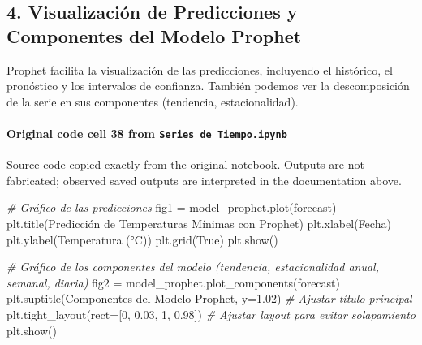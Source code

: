 \documentclass[
  11pt,
]{article}
\newenvironment{Shaded}{}{}
\newcommand{\CommentTok}[1]{\textcolor[rgb]{0.38,0.63,0.69}{\textit{#1}}}
\newcommand{\DecValTok}[1]{\textcolor[rgb]{0.25,0.63,0.44}{#1}}
\newcommand{\FloatTok}[1]{\textcolor[rgb]{0.25,0.63,0.44}{#1}}
\newcommand{\NormalTok}[1]{#1}
\newcommand{\OperatorTok}[1]{\textcolor[rgb]{0.40,0.40,0.40}{#1}}
\newcommand{\StringTok}[1]{\textcolor[rgb]{0.25,0.44,0.63}{#1}}
\newcommand{\VariableTok}[1]{\textcolor[rgb]{0.10,0.09,0.49}{#1}}
\begin{document}
\subsection{4. Visualización de Predicciones y Componentes del Modelo Prophet}\label{4-visualizaciuxf3n-de-predicciones-y-componentes-del-modelo-prophet}

Prophet facilita la visualización de las predicciones, incluyendo el histórico, el pronóstico y los intervalos de confianza. También podemos ver la descomposición de la serie en sus componentes (tendencia, estacionalidad).

\paragraph{\texorpdfstring{Original code cell 38 from \texttt{Series\ de\ Tiempo.ipynb}}{Original code cell 38 from Series de Tiempo.ipynb}}\label{original-code-cell-38-from-series-de-tiempoipynb}

Source code copied exactly from the original notebook. Outputs are not fabricated; observed saved outputs are interpreted in the documentation above.

\begin{Shaded}
\begin{Highlighting}[]
\CommentTok{\# Gráfico de las predicciones}
\NormalTok{fig1 }\OperatorTok{=}\NormalTok{ model\_prophet.plot(forecast)}
\NormalTok{plt.title(}\StringTok{\textquotesingle{}Predicción de Temperaturas Mínimas con Prophet\textquotesingle{}}\NormalTok{)}
\NormalTok{plt.xlabel(}\StringTok{\textquotesingle{}Fecha\textquotesingle{}}\NormalTok{)}
\NormalTok{plt.ylabel(}\StringTok{\textquotesingle{}Temperatura (°C)\textquotesingle{}}\NormalTok{)}
\NormalTok{plt.grid(}\VariableTok{True}\NormalTok{)}
\NormalTok{plt.show()}

\CommentTok{\# Gráfico de los componentes del modelo (tendencia, estacionalidad anual, semanal, diaria)}
\NormalTok{fig2 }\OperatorTok{=}\NormalTok{ model\_prophet.plot\_components(forecast)}
\NormalTok{plt.suptitle(}\StringTok{\textquotesingle{}Componentes del Modelo Prophet\textquotesingle{}}\NormalTok{, y}\OperatorTok{=}\FloatTok{1.02}\NormalTok{) }\CommentTok{\# Ajustar título principal}
\NormalTok{plt.tight\_layout(rect}\OperatorTok{=}\NormalTok{[}\DecValTok{0}\NormalTok{, }\FloatTok{0.03}\NormalTok{, }\DecValTok{1}\NormalTok{, }\FloatTok{0.98}\NormalTok{]) }\CommentTok{\# Ajustar layout para evitar solapamiento}
\NormalTok{plt.show()}
\end{Highlighting}
\end{Shaded}
\end{document}
